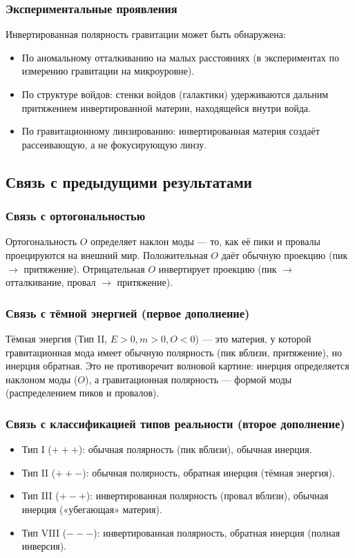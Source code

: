 \documentclass[12pt,a4paper]{article}
\begin{document}
\subsubsection{Экспериментальные проявления}
Инвертированная полярность гравитации может быть обнаружена:
\begin{itemize}
    \item По аномальному отталкиванию на малых расстояниях (в экспериментах по измерению гравитации на микроуровне).
    \item По структуре войдов: стенки войдов (галактики) удерживаются дальним притяжением инвертированной материи, находящейся внутри войда.
    \item По гравитационному линзированию: инвертированная материя создаёт рассеивающую, а не фокусирующую линзу.
\end{itemize}

\subsection{Связь с предыдущими результатами}

\subsubsection{Связь с ортогональностью}
Ортогональность $O$ определяет наклон моды --- то, как её пики и провалы проецируются на внешний мир. Положительная $O$ даёт обычную проекцию (пик $\to$ притяжение). Отрицательная $O$ инвертирует проекцию (пик $\to$ отталкивание, провал $\to$ притяжение).

\subsubsection{Связь с тёмной энергией (первое дополнение)}
Тёмная энергия (Тип II, $E > 0, m > 0, O < 0$) --- это материя, у которой гравитационная мода имеет обычную полярность (пик вблизи, притяжение), но инерция обратная. Это не противоречит волновой картине: инерция определяется наклоном моды ($O$), а гравитационная полярность --- формой моды (распределением пиков и провалов).

\subsubsection{Связь с классификацией типов реальности (второе дополнение)}
\begin{itemize}
    \item Тип I ($+ + +$): обычная полярность (пик вблизи), обычная инерция.
    \item Тип II ($+ + -$): обычная полярность, обратная инерция (тёмная энергия).
    \item Тип III ($+ - +$): инвертированная полярность (провал вблизи), обычная инерция («убегающая» материя).
    \item Тип VIII ($- - -$): инвертированная полярность, обратная инерция (полная инверсия).
\end{itemize}
\end{document}
